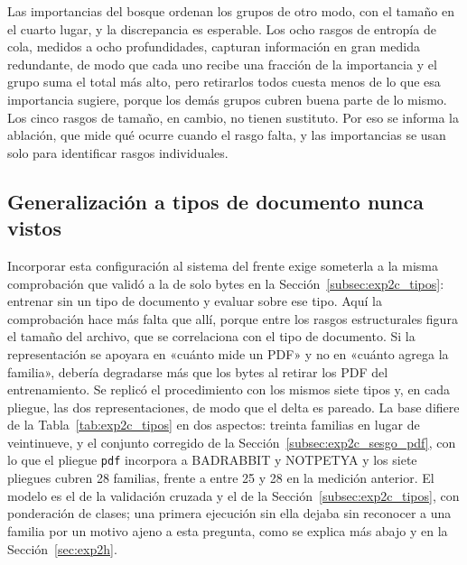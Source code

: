 Las importancias del bosque ordenan los grupos de otro modo, con el tamaño en el cuarto lugar, y la discrepancia es esperable. Los ocho rasgos de entropía de cola, medidos a ocho profundidades, capturan información en gran medida redundante, de modo que cada uno recibe una fracción de la importancia y el grupo suma el total más alto, pero retirarlos todos cuesta menos de lo que esa importancia sugiere, porque los demás grupos cubren buena parte de lo mismo. Los cinco rasgos de tamaño, en cambio, no tienen sustituto. Por eso se informa la ablación, que mide qué ocurre cuando el rasgo falta, y las importancias se usan solo para identificar rasgos individuales.

\subsection{Generalización a tipos de documento nunca vistos}
\label{subsec:exp2e_tipos}

Incorporar esta configuración al sistema del frente exige someterla a la misma comprobación que validó a la de solo bytes en la Sección~\ref{subsec:exp2c_tipos}: entrenar sin un tipo de documento y evaluar sobre ese tipo. Aquí la comprobación hace más falta que allí, porque entre los rasgos estructurales figura el tamaño del archivo, que se correlaciona con el tipo de documento. Si la representación se apoyara en «cuánto mide un PDF» y no en «cuánto agrega la familia», debería degradarse más que los bytes al retirar los PDF del entrenamiento. Se replicó el procedimiento con los mismos siete tipos y, en cada pliegue, las dos representaciones, de modo que el delta es pareado. La base difiere de la Tabla~\ref{tab:exp2c_tipos} en dos aspectos: treinta familias en lugar de veintinueve, y el conjunto corregido de la Sección~\ref{subsec:exp2c_sesgo_pdf}, con lo que el pliegue \texttt{pdf} incorpora a BADRABBIT y NOTPETYA y los siete pliegues cubren 28 familias, frente a entre 25 y 28 en la medición anterior. El modelo es el de la validación cruzada y el de la Sección~\ref{subsec:exp2c_tipos}, con ponderación de clases; una primera ejecución sin ella dejaba sin reconocer a una familia por un motivo ajeno a esta pregunta, como se explica más abajo y en la Sección~\ref{sec:exp2h}.

